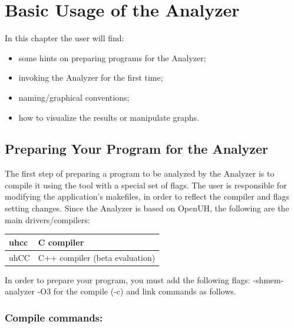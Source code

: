 \section{Basic Usage of the \openshmem Analyzer}
\label{chapter:basic-usage}

In this chapter the user will find:

\begin{itemize}
\item some hints on preparing programs for the \openshmem Analyzer;
\item invoking the \openshmem Analyzer for the first time;
\item naming/graphical conventions;
\item how to visualize the results or manipulate graphs.
\end{itemize}

\subsection{Preparing Your Program for the \openshmem Analyzer}

The first step of preparing a program to be analyzed by the \openshmem
Analyzer is to compile it using the tool with a special set of
flags. The user is responsible for modifying the application's
makefiles, in order to reflect the compiler and flags setting
changes. Since the \openshmem Analyzer is based on OpenUH, the
following are the main drivers/compilers:

\vspace{0.1in}

\begin{center}
  \begin{tabular}{|l | l |}
    \hline
    uhcc & C compiler \\
    \hline
    uhCC & C++ compiler (beta evaluation) \\
    \hline
  \end{tabular}
\end{center}

\vspace{0.1in}

In order to prepare your program, you must add the following flags:
-shmem-analyzer -O3 for the compile (-c) and link commands as follows.

\subsubsection*{Compile commands:}

